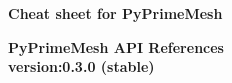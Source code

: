 \documentclass[9pt,landscape]{article}
\begin{document}
\raggedright
\footnotesize


\begin{center}
     \Huge{\textbf{Cheat sheet for PyPrimeMesh}} \\
\end{center}
\begin{center}
  \Large{\textbf{PyPrimeMesh API References}} \\
  \small{\textbf{version:0.3.0 (stable) }} \\
\end{center}
\vspace{-0.15cm}
\noindent\makebox[\linewidth]{\rule{\paperwidth}{2pt}}
\end{document}
